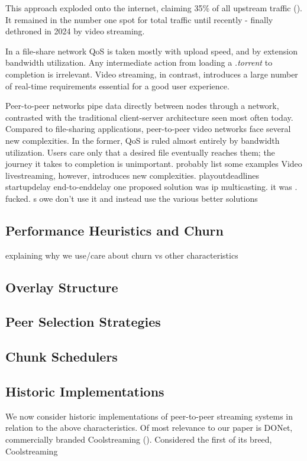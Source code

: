 \documentclass[12pt,a4paper]{article}
\begin{document}
This approach exploded onto the internet, claiming 35\% of all upstream traffic (\cite{archiveCacheLogicResearch}). It remained in the number one spot for total traffic until recently - finally dethroned in 2024 by video streaming. 

In a file-share network QoS is taken mostly with upload speed, and by extension bandwidth utilization. Any intermediate action from loading a \textit{.torrent} to completion is irrelevant. Video streaming, in contrast, introduces a large number of real-time requirements essential for a good user experience.



Peer-to-peer networks pipe data directly between nodes through a network, contrasted with the traditional client-server architecture seen most often today.  Compared to file-sharing applications, peer-to-peer video networks face several new complexities. In the former, QoS is ruled almost entirely by bandwidth utilization. Users care only that a desired file eventually reaches them; the journey it takes to completion is unimportant.  probably list some examples Video livestreaming, however, introduces new complexities. playoutdeadlines startupdelay end-to-enddelay
one proposed solution was ip multicasting. it was . fucked. s owe don't use it and instead use the various better solutions
\subsection{Performance Heuristics and Churn}
explaining why we use/care about churn vs other characteristics
\subsection{Overlay Structure}
\subsection{Peer Selection Strategies}
\subsection{Chunk Schedulers}
\subsection{Historic Implementations}
We now consider historic implementations of peer-to-peer streaming systems in relation to the above characteristics. Of most relevance to our paper is DONet, commercially branded Coolstreaming (\cite{1498486}). Considered the first of its breed, Coolstreaming \cite{Xie2007} \cite{asdasd} \cite{1498486}
\end{document}
